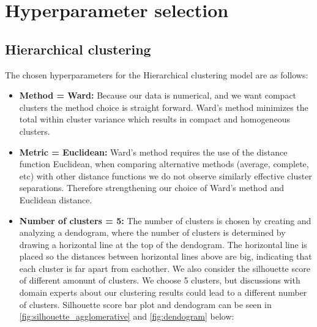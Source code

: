 \section{Hyperparameter selection}

\subsection{Hierarchical clustering}

The chosen hyperparameters for the Hierarchical clustering model are as follows:

\begin{itemize}
    \item \textbf{Method = Ward:} Because our data is numerical, and we want compact clusters the method choice is straight forward. Ward's method minimizes the total within cluster variance which results in compact and homogeneous clusters.
    
    \item \textbf{Metric = Euclidean:} Ward's method requires the use of the distance function Euclidean, when comparing alternative methods (average, complete, etc) with other distance functions we do not observe similarly effective cluster separations. Therefore strengthening our choice of Ward's method and Euclidean distance.
    \item \textbf{Number of clusters = 5:} The number of clusters is chosen by creating and analyzing a dendogram, where the number of clusters is determined by drawing a horizontal line at the top of the dendogram. The horizontal line is placed so the distances between horizontal lines above are big, indicating that each cluster is far apart from eachother. We also consider the silhouette score of different amonunt of clusters. We choose 5 clusters, but discussions with domain experts about our clustering results could lead to a different number of clusters. Silhouette score bar plot and dendogram can be seen in \autoref{fig:silhouette_agglomerative} and \autoref{fig:dendogram} below:
\end{itemize}

